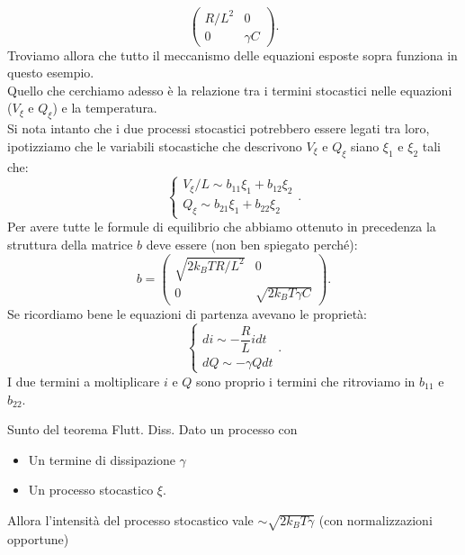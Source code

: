 \begin{exmp}
\[	\begin{pmatrix} 
	    R/L^2 & 0\\
	    0    & \gamma C
	\end{pmatrix} 
    .\] 
    Troviamo allora che tutto il meccanismo delle equazioni esposte sopra funziona in questo esempio.\\
    Quello che cerchiamo adesso è la relazione tra i termini stocastici nelle equazioni ($V_\xi$ e $Q_\xi$) e la temperatura. \\
    Si nota intanto che i due processi stocastici potrebbero essere legati tra loro, ipotizziamo che le variabili stocastiche che descrivono $V_\xi$ e $Q_\xi$ siano $\xi_1$ e $\xi_2$ tali che:
    \[
        \begin{cases}
            V_\xi /L \sim  b_{11} \xi_1 + b_{12}\xi_2\\
	    Q_\xi \sim b_{21}\xi_1 + b_{22}\xi_2
        \end{cases}
    .\] 
    Per avere tutte le formule di equilibrio che abbiamo ottenuto in precedenza la struttura della matrice $b$ deve essere (non ben spiegato perché): 
    \[
        b = 
	\begin{pmatrix} 
	    \sqrt{2k_BTR /L^2} & 0 \\
	    0             & \sqrt{2k_BT\gamma C} 
	\end{pmatrix} 
    .\] 
    Se ricordiamo bene le equazioni di partenza avevano le proprietà:
    \[
        \begin{cases}
            di \sim -\dfrac{R}{L}idt \\
	    dQ \sim - \gamma Qdt
        \end{cases}
    .\] 
    I due termini a moltiplicare $i$ e $Q$ sono proprio i termini che ritroviamo in $b_{11}$ e $b_{22}$.
\end{exmp}
\noindent
\begin{redbox}{Sunto del teorema Flutt. Diss.}
    Dato un processo con 
    \begin{itemize}
        \item Un termine di dissipazione $\gamma$
	\item Un processo stocastico $\xi$.
    \end{itemize}
    Allora l'intensità del processo stocastico vale $\sim \sqrt{2k_BT \gamma}$ (con normalizzazioni opportune)
\end{redbox}
\noindent
